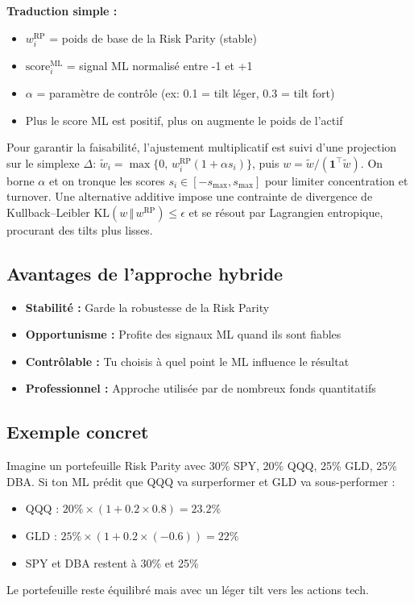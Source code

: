 \documentclass[11pt,a4paper]{article}
\begin{document}
\textbf{Traduction simple :} 
\begin{itemize}
\item \(w_i^{\text{RP}}\) = poids de base de la Risk Parity (stable)
\item \(\text{score}_i^{\text{ML}}\) = signal ML normalisé entre -1 et +1
\item \(\alpha\) = paramètre de contrôle (ex: 0.1 = tilt léger, 0.3 = tilt fort)
\item Plus le score ML est positif, plus on augmente le poids de l'actif
\end{itemize}
\noindent Pour garantir la faisabilité, l'ajustement multiplicatif est suivi d'une projection sur le simplexe \(\Delta\): \(\tilde w_i = \max\{0,\, w_i^{\text{RP}} (1+\alpha s_i)\}\), puis \(w=\tilde w / (\mathbf{1}^\top \tilde w)\). On borne \(\alpha\) et on tronque les scores \(s_i\in[-s_{\max}, s_{\max}]\) pour limiter concentration et turnover. Une alternative additive impose une contrainte de divergence de Kullback–Leibler \(\text{KL}(w\,\Vert\,w^{\text{RP}})\le \epsilon\) et se résout par Lagrangien entropique, procurant des tilts plus lisses.

\subsection{Avantages de l'approche hybride}
\begin{itemize}
\item \textbf{Stabilité :} Garde la robustesse de la Risk Parity
\item \textbf{Opportunisme :} Profite des signaux ML quand ils sont fiables
\item \textbf{Contrôlable :} Tu choisis à quel point le ML influence le résultat
\item \textbf{Professionnel :} Approche utilisée par de nombreux fonds quantitatifs
\end{itemize}

\subsection{Exemple concret}
Imagine un portefeuille Risk Parity avec 30\% SPY, 20\% QQQ, 25\% GLD, 25\% DBA. Si ton ML prédit que QQQ va surperformer et GLD va sous-performer :
\begin{itemize}
\item QQQ : \(20\% \times (1 + 0.2 \times 0.8) = 23.2\%\)
\item GLD : \(25\% \times (1 + 0.2 \times (-0.6)) = 22\%\)
\item SPY et DBA restent à 30\% et 25\%
\end{itemize}
Le portefeuille reste équilibré mais avec un léger tilt vers les actions tech.
\end{document}
